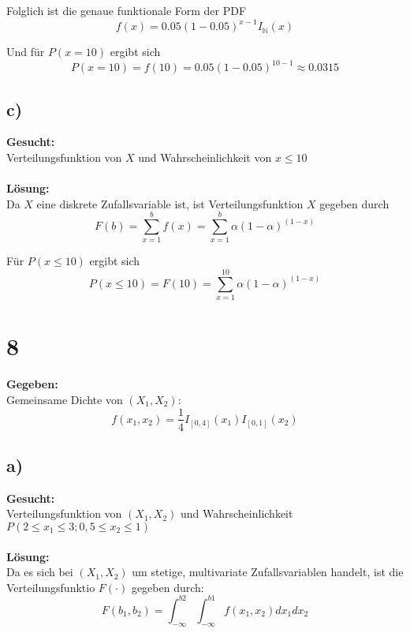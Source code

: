 \documentclass{article}
\begin{document}
Folglich ist die genaue funktionale Form der PDF \[f(x) = 0.05(1-0.05)^{x-1}I_{\mathbb{N}}(x)\] 

Und für $P(x = 10)$ ergibt sich \[P(x = 10)=f(10)= 0.05(1-0.05)^{10-1} \approx 0.0315 \]
\subsection*{c)}
\textbf{Gesucht:}\\

Verteilungsfunktion von $X$ und Wahrscheinlichkeit von $x \leq 10$ \\ \\
\textbf{Lösung:}\\

Da $X$ eine diskrete Zufallsvariable ist, ist Verteilungsfunktion $X$ gegeben durch \[F(b) = \sum_{x=1}^{b}f(x)= \sum_{x=1}^{b}\alpha(1-\alpha)^{(1-x)}\] 

Für $P(x \leq 10)$ ergibt sich \[P(x \leq 10)= F(10) = \sum_{x=1}^{10}\alpha(1-\alpha)^{(1-x)}\]

\section*{8}

\textbf{Gegeben:}\\

Gemeinsame Dichte von $(X_{1}, X_{2})$:\[f(x_{1}, x_{2})= \frac{1}{4}I_{[0,4]}(x_{1})I_{[0,1]}(x_{2})\]
\subsection*{a)}
\textbf{Gesucht:}\\

Verteilungsfunktion von $(X_{1}, X_{2})$ und Wahrscheinlichkeit $P(2 \leq x_{1} \leq 3; 0,5\leq x_{2}\leq 1)$ \\ \\
\textbf{Lösung:} \\

Da es sich bei $(X_{1}, X_{2})$ um stetige, multivariate Zufallsvariablen handelt, ist die Verteilungsfunktio $F(\cdot)$ gegeben durch: 
\[F(b_{1}, b_{2}) = \int_{-\infty}^{b2}\int_{-\infty}^{b1}f(x_{1}, x_{2}) dx_{1}dx_{2}\] \\
\end{document}
